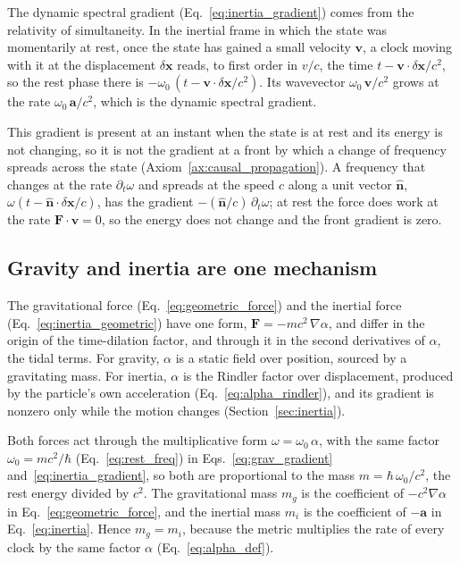 \documentclass[aps,prd,onecolumn,tightenlines,nofootinbib,notitlepage,11pt,floatfix]{revtex4-2}
\theoremstyle{indentedtheorem}
\begin{document}
The dynamic spectral gradient (Eq.~\eqref{eq:inertia_gradient}) comes from the relativity of simultaneity. In the inertial frame in which the state was momentarily at rest, once the state has gained a small velocity $\mathbf{v}$, a clock moving with it at the displacement $\delta\mathbf{x}$ reads, to first order in $v/c$, the time $t-\mathbf{v}\cdot\delta\mathbf{x}/c^2$, so the rest phase there is $-\omega_0\,(t-\mathbf{v}\cdot\delta\mathbf{x}/c^2)$. Its wavevector $\omega_0\,\mathbf{v}/c^2$ grows at the rate $\omega_0\,\mathbf{a}/c^2$, which is the dynamic spectral gradient.

This gradient is present at an instant when the state is at rest and its energy is not changing, so it is not the gradient at a front by which a change of frequency spreads across the state (Axiom~\ref{ax:causal_propagation}). A frequency that changes at the rate $\partial_t\omega$ and spreads at the speed $c$ along a unit vector $\hat{\mathbf{n}}$, $\omega(t-\hat{\mathbf{n}}\cdot\delta\mathbf{x}/c)$, has the gradient $-(\hat{\mathbf{n}}/c)\,\partial_t\omega$; at rest the force does work at the rate $\mathbf{F}\cdot\mathbf{v}=0$, so the energy does not change and the front gradient is zero.

\subsection{Gravity and inertia are one mechanism}
\label{sec:duality}

The gravitational force (Eq.~\eqref{eq:geometric_force}) and the inertial force (Eq.~\eqref{eq:inertia_geometric}) have one form, $\mathbf{F} = -mc^2\,\nabla\alpha$, and differ in the origin of the time-dilation factor, and through it in the second derivatives of $\alpha$, the tidal terms. For gravity, $\alpha$ is a static field over position, sourced by a gravitating mass. For inertia, $\alpha$ is the Rindler factor over displacement, produced by the particle's own acceleration (Eq.~\eqref{eq:alpha_rindler}), and its gradient is nonzero only while the motion changes (Section~\ref{sec:inertia}).

Both forces act through the multiplicative form $\omega=\omega_0 \, \alpha$, with the same factor $\omega_0=mc^2/\hbar$ (Eq.~\eqref{eq:rest_freq}) in Eqs.~\eqref{eq:grav_gradient} and~\eqref{eq:inertia_gradient}, so both are proportional to the mass $m=\hbar \, \omega_0/c^2$, the rest energy divided by $c^2$. The gravitational mass $m_g$ is the coefficient of $-c^2\nabla\alpha$ in Eq.~\eqref{eq:geometric_force}, and the inertial mass $m_i$ is the coefficient of $-\mathbf{a}$ in Eq.~\eqref{eq:inertia}. Hence $m_g=m_i$, because the metric multiplies the rate of every clock by the same factor $\alpha$ (Eq.~\eqref{eq:alpha_def}).
\end{document}
